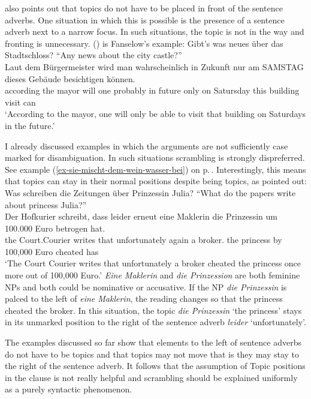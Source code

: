 \citet{Fanselow2006a} also points out that topics do not have to be placed in front of the sentence
adverbs. One situation in which this is possible is the presence of a sentence adverb next to a
narrow focus. In such situations, the topic is not in the way and fronting is unnecessary. ()
is Fanselow's example:
\ea
Gibt's was neues über das Stadtschloss? ``Any news about the city castle?''\\
\gll Laut dem Bürgermeister wird man wahrscheinlich in Zukunft nur am SAMSTAG dieses Gebäude besichtigen können.\\ 
     according the mayor will one probably in future only on Satursday this building visit can\\
\glt `According to the mayor, one will only be able to visit that building on Saturdays in the future.'
\z

\noindent
I already discussed examples in which the arguments are not sufficiently case marked for
disambiguation. In such situations scrambling is strongly dispreferred. See example (\ref{ex-sie-mischt-dem-wein-wasser-bei}) on p.\,\pageref{ex-sie-mischt-dem-wein-wasser-bei}. Interestingly, this means
that topics can stay in their normal positions despite being topics, as \citet{Fanselow2006a}
pointed out:
\ea
Was schreiben die Zeitungen über Prinzessin Julia? ``What do the papers write about princess Julia?''\\
\gll Der Hofkurier     schreibt, dass leider        erneut eine Maklerin    die Prinzessin um 100.000 Euro betrogen hat.\\
     the Court.Courier writes    that unfortunately again  a    broker.\F{} the princess   by 100,000 Euro cheated has\\
\glt `The Court Courier writes that unfortunately a broker cheated the princess once more out of 100,000 Euro.'
\z
\emph{Eine Maklerin} and \emph{die Prinzession} are both feminine NPs and both could be nominative or
accusative. If the NP \emph{die Prinzessin} is palced to the left of \emph{eine Maklerin}, the reading changes so that the princess cheated the
broker. In this situation, the topic \emph{die Prinzessin} `the princess' stays in its unmarked position to the right of the
sentence adverb \emph{leider} `unfortunately'. 

The examples discussed so far show that elements to the left of
sentence adverbs do not have to be topics and that topics may not move that is they may stay to the
right of the sentence adverb. It follows that the assumption of Topic positions in the clause is not
really helpful and scrambling should be explained uniformly as a purely syntactic phenomenon.

